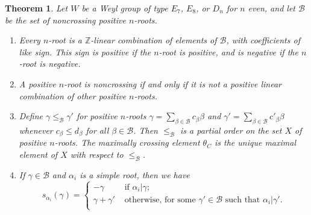 \documentclass[11pt]{amsart}
\theoremstyle{plain}
\newtheorem{theorem}{Theorem}[section]
\theoremstyle{definition}
\theoremstyle{remark}
\numberwithin{equation}{subsection}
\newcommand{\al}{\alpha}
\newcommand{\be}{\beta}
\newcommand{\Z}{{\mathbb Z}}
\newcommand{\Be}{\mathcal B}
\begin{document}
\begin{theorem}\label{thm:positive}
Let $W$ be a Weyl group of type $E_7$, $E_8$, or $D_n$ for $n$ even, and let
$\Be$ be the set of noncrossing positive $n$-roots.
\begin{enumerate}
    \item[{\rm (i)}]{Every $n$-root is a $\Z$-linear combination of elements of
     $\Be$, with coefficients of like sign. This sign is positive if the
 $n$-root is positive, and is negative if the $n$-root is negative.}
\item[{\rm (ii)}]{A positive $n$-root is noncrossing if and only if it is not a
     positive linear combination of other positive $n$-roots.}
 \item[{\rm (iii)}] Define $\gamma\le_\Be\gamma'$ for positive $n$-roots
     $\gamma=\sum_{\be \in \Be} c_\be \be$ and $\gamma'=\sum_{\be\in \Be}c'_\be
     \be$ whenever $c_\be \leq d_\be$ for all $\be \in \Be$. Then $\le_\Be$ is a
     partial order on the set $X$ of positive $n$-roots. The maximally crossing
     element $\theta_C$ is the unique maximal element of $X$ with respect to
     $\le_\Be$.
 \item[{\rm (iv)}]{If $\gamma \in \Be$ and $\al_i$ is a simple root, then we
     have $$ s_{\al_i}(\gamma) = \begin{cases} -\gamma & \text{\ if\ } \al_i |
         \gamma;\\ \gamma + \gamma' & \text{\ otherwise,\ for\ some\ } \gamma'
         \in \Be {\text{\ such\ that\ }} \al_i | \gamma'.\\
 \end{cases} $$}
\end{enumerate}\end{theorem}
\end{document}
